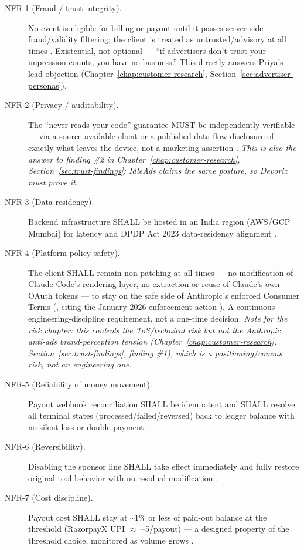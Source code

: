 \begin{description}
\item[NFR-1 (Fraud / trust integrity).] No event is eligible for billing or payout until it passes server-side fraud/validity filtering; the client is treated as untrusted/advisory at all times \cite{mvpspec_2026}. Existential, not optional --- ``if advertisers don't trust your impression counts, you have no business.'' This directly answers Priya's lead objection (Chapter~\ref{chap:customer-research}, Section~\ref{sec:advertiser-personas}).
\item[NFR-2 (Privacy / auditability).] The ``never reads your code'' guarantee MUST be independently verifiable --- via a source-available client or a published data-flow disclosure of exactly what leaves the device, not a marketing assertion \cite{masterplan_2026}. \emph{This is also the answer to finding \#2 in Chapter~\ref{chap:customer-research}, Section~\ref{sec:trust-findings}: IdleAds claims the same posture, so Devorix must prove it.}
\item[NFR-3 (Data residency).] Backend infrastructure SHALL be hosted in an India region (AWS/GCP Mumbai) for latency and DPDP Act 2023 data-residency alignment \cite{mvpspec_2026}.
\item[NFR-4 (Platform-policy safety).] The client SHALL remain non-patching at all times --- no modification of Claude Code's rendering layer, no extraction or reuse of Claude's own OAuth tokens --- to stay on the safe side of Anthropic's enforced Consumer Terms (\cite{masterplan_2026}, citing the January 2026 enforcement action \cite{anthropic_enforcement_2026}). A continuous engineering-discipline requirement, not a one-time decision. \emph{Note for the risk chapter: this controls the ToS/technical risk but not the Anthropic anti-ads brand-perception tension (Chapter~\ref{chap:customer-research}, Section~\ref{sec:trust-findings}, finding \#1), which is a positioning/comms risk, not an engineering one.}
\item[NFR-5 (Reliability of money movement).] Payout webhook reconciliation SHALL be idempotent and SHALL resolve all terminal states (processed/failed/reversed) back to ledger balance with no silent loss or double-payment \cite{mvpspec_2026}.
\item[NFR-6 (Reversibility).] Disabling the sponsor line SHALL take effect immediately and fully restore original tool behavior with no residual modification \cite{mvpspec_2026}.
\item[NFR-7 (Cost discipline).] Payout cost SHALL stay at \textasciitilde1\% or less of paid-out balance at the  threshold (RazorpayX UPI $\approx$ --5/payout) --- a designed property of the threshold choice, monitored as volume grows \cite{mvpspec_2026}.

\end{description}
